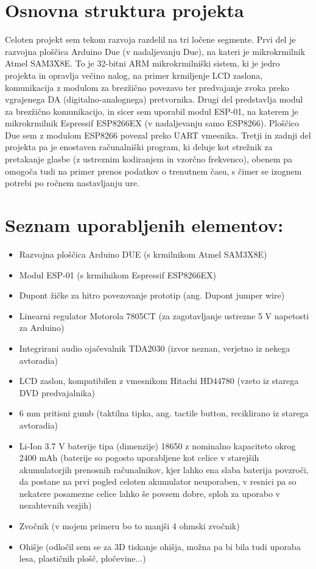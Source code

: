 \documentclass[12pt,a4paper,twoside,openright,slovene]{book}
\begin{document}
\section{Osnovna struktura projekta}
Celoten projekt sem tekom razvoja razdelil na tri ločene segmente. Prvi del je razvojna ploščica Arduino Due (v nadaljevanju Due), na kateri je mikrokrmilnik Atmel SAM3X8E. To je 32-bitni ARM mikrokrmilniški sistem, ki je jedro projekta in opravlja večino nalog, na primer krmiljenje LCD zaslona, komunikacija z modulom za brezžično povezavo ter predvajanje zvoka preko vgrajenega DA (digitalno-analognega) pretvornika. Drugi del predstavlja modul za brezžično komunikacijo, in sicer sem uporabil modul ESP-01, na katerem je mikrokrmilnik Espressif ESP8266EX (v nadaljevanju samo ESP8266). Ploščico Due sem z modulom ESP8266 povezal preko UART vmesnika. Tretji in zadnji del projekta pa je enostaven računalniški program, ki deluje kot strežnik za pretakanje glasbe (z ustreznim kodiranjem in vzorčno frekvenco), obenem pa omogoča tudi na primer prenos podatkov o trenutnem času, s čimer se izognem potrebi po ročnem nastavljanju ure.



\section{Seznam uporabljenih elementov:} \label{uporabljeni_elementi}
\begin{itemize}
\item Razvojna ploščica Arduino DUE (s krmilnikom Atmel SAM3X8E)
\item Modul ESP-01 (s krmilnikom Espressif ESP8266EX)
\item Dupont žičke za hitro povezovanje prototip (ang. Dupont jumper wire)
\item Linearni regulator Motorola 7805CT (za zagotavljanje ustrezne 5 V napetosti za Arduino)
\item Integrirani audio ojačevalnik TDA2030 (izvor neznan, verjetno iz nekega avtoradia)
\item LCD zaslon, kompatibilen z vmesnikom Hitachi HD44780 (vzeto iz starega DVD predvajalnika)
\item 6 mm pritisni gumb (taktilna tipka, ang. tactile button, reciklirano iz starega avtoradia)
\item Li-Ion 3.7 V baterije tipa (dimenzije) 18650 z nominalno kapaciteto okrog 2400 mAh (baterije so pogosto uporabljene kot celice v  starejših akumulatorjih prenosnih računalnikov, kjer lahko ena slaba baterija povzroči, da postane na prvi pogled celoten akumulator  neuporaben, v resnici pa so nekatere posamezne celice lahko še povsem dobre, sploh za uporabo v nezahtevnih vezjih)
\item Zvočnik (v mojem primeru bo to manjši 4 ohmski zvočnik)
\item Ohišje (odločil sem se za 3D tiskanje ohišja, možna pa bi bila tudi uporaba lesa, plastičnih plošč, pločevine...)
\end{itemize}
\end{document}
